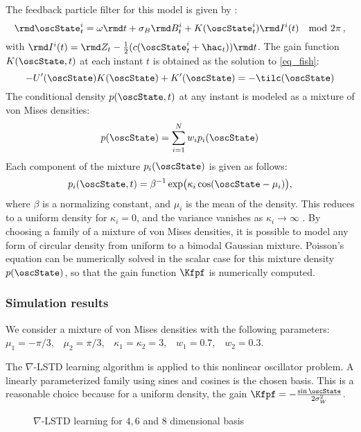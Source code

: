 The feedback particle filter for this model is given by :
\begin{equation*}
\rmd \oscState^{i}_t = \omega \rmd t
+\sigma_{B}\rmd B^{i}_t+K(\oscState^{i}_t) \rmd I^i(t)  \quad  \text{mod }2\pi\, ,
\end{equation*}
with $\rmd I^i(t) = \rmd Z_t-\frac{1}{2}(c(\oscState_t^{i}+\hac_t))\rmd t$.
The gain function $K(\oscState,t)$ at each instant $t$ is obtained as the solution to \eqref{eq_fish}:
\begin{equation*}
- U'(\oscState) K(\oscState) + K'(\oscState) = -\tilc(\oscState)  %
\end{equation*}
The conditional density $p(\oscState,t)$ at any instant is modeled as a mixture of von Mises densities:
\begin{equation*}
p(\oscState)=\sum_{i=1}^{N}w_{i}p_{i}(\oscState)
\end{equation*}
Each component of the mixture $p_{i}(\oscState)$ is given as follows:
\begin{equation*}
p_{i}(\oscState,t) =  \beta^{-1} \exp  \bigl( \kappa_i \cos(\oscState-\mu_{i} )    \bigr),
\end{equation*}
where $\beta$ is a normalizing constant, and $\mu_{i}$ is the mean of the density. This reduces to   a uniform density for $\kappa_{i}=0$, and the variance vanishes as $\kappa_{i}\to \infty$ \cite{haspea00}. By choosing a family of a mixture of von Mises densities, it is possible to model any form of circular density from uniform to a bimodal Gaussian mixture.
Poisson's equation can be numerically solved in the scalar case for this mixture density $p(\oscState)$, so that the gain function $\Kfpf$ is numerically computed.

\subsubsection*{Simulation results}
We consider a mixture of von Mises densities with the following parameters: $\mu_1 = -\pi/3$,\ \
$\mu_2 = \pi/3$,\ \
$\kappa_1=\kappa_2=3$,\ \
$w_1 =0.7$,\ \
$w_2 =0.3$.


The $\nabla$-LSTD learning algorithm is applied to this nonlinear oscillator problem. A linearly parameterized family using sines and cosines is the chosen basis. This is a reasonable choice because for a uniform density, the gain $\Kfpf=-\frac{\sin \oscState}{2\sigma_{W}^{2}}$.

\begin{figure*}
	\caption{$\nabla$-LSTD learning for $4,6$ and $8$ dimensional basis}
	\label{f:qad468}
\end{figure*}

